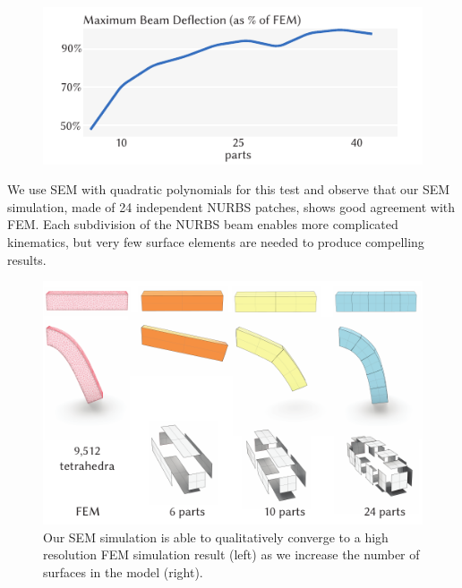 \begin{figure}[h]
  \includegraphics[width=\columnwidth]{figures/deflection_full.pdf}
	\caption{}
  \label{fig:plot_beam_deflection}
\end{figure}

We use SEM with quadratic polynomials for this test and observe that our SEM simulation, made of 24 independent NURBS patches, shows good agreement with FEM. Each subdivision of the NURBS beam enables more complicated kinematics, 
but very few surface elements are needed to produce compelling results.


\begin{figure}[h]
  \includegraphics[width=\columnwidth]{figures/beams.pdf}
  \caption{Our SEM simulation is able to qualitatively converge to a high resolution FEM simulation result (left) as we increase the number of surfaces in the model (right). }
  \label{fig:convergence}
\end{figure}


